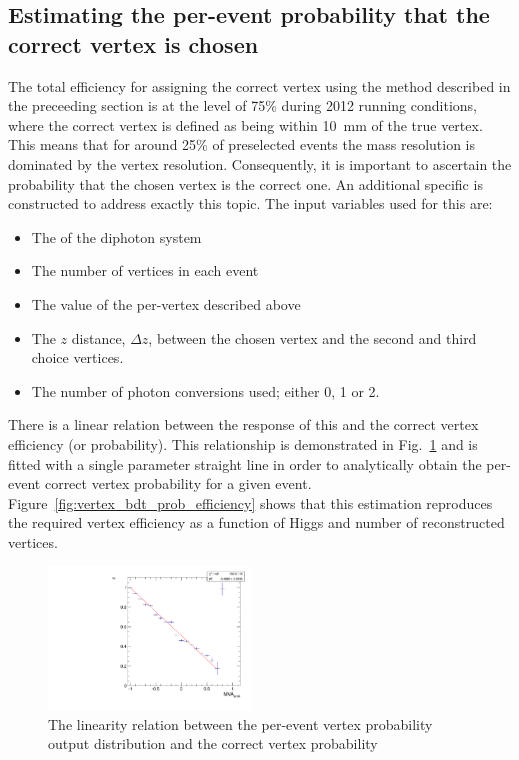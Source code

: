 \subsection{Estimating the per-event probability that the correct vertex is chosen}
\label{sec:bdt_prob}

The total efficiency for assigning the correct vertex using the method described in the preceeding section is at the level of 75\% during 2012 running conditions, where the correct vertex is defined as being within 10~mm of the true vertex. This means that for around 25\% of preselected events the mass resolution is dominated by the vertex resolution. Consequently, it is important to ascertain the probability that the chosen vertex is the correct one. An additional specific \BDT is constructed to address exactly this topic. The input variables used for this \BDT are:

\begin{itemize}
  \item The \pT of the diphoton system
  \item The number of vertices in each event
  \item The value of the per-vertex \BDT described above
  \item The $z$ distance, $\Delta z$, between the chosen vertex and the second and third choice vertices.
  \item The number of photon conversions used; either 0, 1 or 2.
\end{itemize}

There is a linear relation between the response of this \BDT and the correct vertex efficiency (or probability). This relationship is demonstrated in Fig.~\ref{fig:vertex_bdt_prob} and is fitted with a single parameter straight line in order to analytically obtain the per-event correct vertex probability for a given event. Figure~\ref{fig:vertex_bdt_prob_efficiency} shows that this estimation reproduces the required vertex efficiency as a function of Higgs \pT and number of reconstructed vertices.

\begin{figure}
  \includegraphics[width=0.48\textwidth]{analysis_comps/plots/vertex_bdt_prob.pdf}
  \caption{The linearity relation between the per-event vertex probability \BDT output distribution and the correct vertex probability}
  \label{fig:vertex_bdt_prob}
\end{figure}

